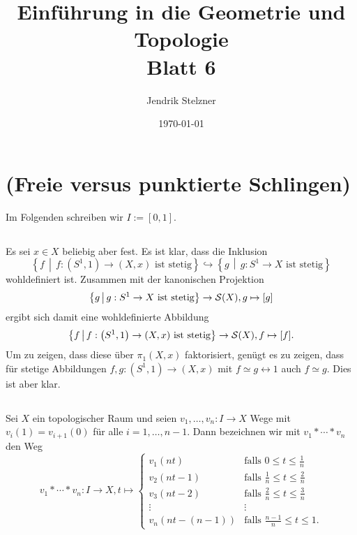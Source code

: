 \documentclass[a4paper,10pt]{article}
\title{\sc Einführung in die Geometrie und Topologie \\ \Large Blatt 6}
\author{Jendrik Stelzner}
\date{\today}
\begin{document}
\maketitle





\section{(Freie versus punktierte Schlingen)}
Im Folgenden schreiben wir $I := [0,1]$.


\subsection{}
Es sei $x \in X$ beliebig aber fest. Es ist klar, dass die Inklusion
\[
 \left\{ f \,\middle|\, f : \left(S^1,1\right) \to (X,x) \text{ ist stetig} \right\}
 \hookrightarrow
 \left\{ g \,\middle|\, g : S^1 \to X \text{ ist stetig}\right\}
 \]
wohldefiniert ist. Zusammen mit der kanonischen Projektion
\[
 \left\{ g \,\middle|\, g : S^1 \to X \text{ ist stetig}\right\} \to \mathcal{S}(X), g \mapsto [g]
\]
ergibt sich damit eine wohldefinierte Abbildung
\[
 \left\{ f \,\middle|\, f : \left(S^1,1\right) \to (X,x) \text{ ist stetig} \right\} \to \mathcal{S}(X), f \mapsto [f].
\]
Um zu zeigen, dass diese über $\pi_1(X,x)$ faktorisiert, genügt es zu zeigen, dass für stetige Abbildungen $f,g : (S^1, 1) \to (X, x)$ mit $f \simeq g \rel 1$ auch $f \simeq g$. Dies ist aber klar.


\subsection{}

\begin{defi}
 Sei $X$ ein topologischer Raum und seien $v_1, \ldots, v_n : I \to X$ Wege mit $v_i(1) = v_{i+1}(0)$ für alle $i=1,\ldots,n-1$. Dann bezeichnen wir mit $v_1 * \cdots * v_n$ den Weg
 \[
  v_1 * \cdots * v_n : I \to X, t \mapsto
  \begin{cases}
   v_1(nt)       & \text{falls } 0 \leq t \leq \frac{1}{n} \\
   v_2(nt-1)     & \text{falls } \frac{1}{n} \leq t \leq \frac{2}{n} \\
   v_3(nt-2)     & \text{falls } \frac{2}{n} \leq t \leq \frac{3}{n} \\
   \vdots        & \vdots \\
   v_n(nt-(n-1)) & \text{falls } \frac{n-1}{n} \leq t \leq 1.
  \end{cases}
 \]
\end{defi}
\end{document}
